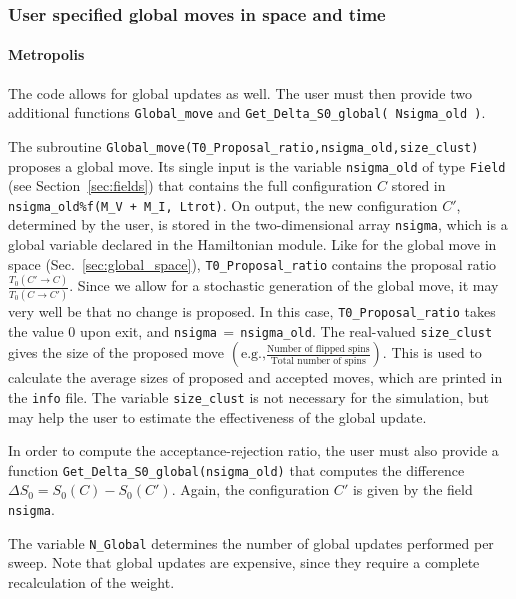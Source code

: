\label{sec:global_slice}
%  

\subsubsection{User specified global moves in space and time }
\paragraph{Metropolis}
\label{sec:global_space_time_M}
The code allows for global updates as well. The user must then provide two additional functions \texttt{Global\_move} and \texttt{Get\_\-Delta\_\-S0\_\-global( Nsigma\_old )}.   

The subroutine  \texttt{Global\_move(T0\_Proposal\_ratio,nsigma\_old,size\_clust)}  proposes  a global move. 
Its single input is the variable \texttt{nsigma\_old} of type \texttt{Field} (see Section~\ref{sec:fields}) that contains  the full  configuration $C$ stored in \texttt{nsigma\_old\%f(M\_V + M\_I, Ltrot)}.  On output, the new configuration $C'$, determined by the user,  is stored in the two-dimensional array \texttt{nsigma}, which is a global variable declared in the Hamiltonian module.
Like for the global move in space (Sec.~\ref{sec:global_space}), \texttt{T0\_Proposal\_ratio} contains the proposal ratio $\frac{T_0(C' \rightarrow C)}{T_0(C \rightarrow C')} $.
Since we allow for a stochastic  generation of  the global move, it may very well be that no change is proposed. In this case, \texttt{T0\_Proposal\_ratio}   takes the value 0 upon exit, and  \texttt{nsigma$\,=\,$nsigma\_old}.   
The real-valued \texttt{size\_clust} gives the size of the proposed move $\left(\text{e.g.,} \tfrac{\text{Number of flipped spins}}{\text{Total number of spins}}\right)$. This is used to calculate the average sizes of proposed and accepted moves, which are printed in the \texttt{info} file. The variable \texttt{size\_clust} is not necessary for the simulation, but may help the user to estimate the effectiveness of the global update.

In order to compute the acceptance-rejection ratio,  the user must also provide a function 
\texttt{Get\_\-Delta\_\-S0}\texttt{\_\-global(nsigma\_old)} that computes the difference $\Delta S_0=S_0(C)-S_0(C')$. Again, the configuration $C'$ is given by the field \texttt{nsigma}.

The variable \texttt{N\_Global} determines the number of global updates performed per sweep. Note that global updates are expensive, since they require a complete recalculation of the weight.

